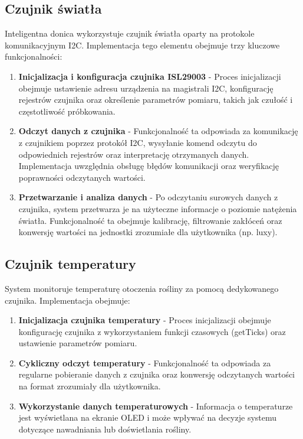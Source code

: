 \documentclass{article}
\begin{document}
\subsection{Czujnik światła}
\label{sec:czujnik_swiatla}
Inteligentna donica wykorzystuje czujnik światła oparty na protokole komunikacyjnym I2C. Implementacja tego elementu obejmuje trzy kluczowe funkcjonalności:

\begin{enumerate}
    \item \textbf{Inicjalizacja i konfiguracja czujnika ISL29003} - Proces inicjalizacji obejmuje ustawienie adresu urządzenia na magistrali I2C, konfigurację rejestrów czujnika oraz określenie parametrów pomiaru, takich jak czułość i częstotliwość próbkowania.

    \item \textbf{Odczyt danych z czujnika} - Funkcjonalność ta odpowiada za komunikację z czujnikiem poprzez protokół I2C, wysyłanie komend odczytu do odpowiednich rejestrów oraz interpretację otrzymanych danych. Implementacja uwzględnia obsługę błędów komunikacji oraz weryfikację poprawności odczytanych wartości.

    \item \textbf{Przetwarzanie i analiza danych} - Po odczytaniu surowych danych z czujnika, system przetwarza je na użyteczne informacje o poziomie natężenia światła. Funkcjonalność ta obejmuje kalibrację, filtrowanie zakłóceń oraz konwersję wartości na jednostki zrozumiałe dla użytkownika (np. luxy).
\end{enumerate}

\subsection{Czujnik temperatury}
System monitoruje temperaturę otoczenia rośliny za pomocą dedykowanego czujnika. Implementacja obejmuje:

\begin{enumerate}
    \item \textbf{Inicjalizacja czujnika temperatury} - Proces inicjalizacji obejmuje konfigurację czujnika z wykorzystaniem funkcji czasowych (getTicks) oraz ustawienie parametrów pomiaru.
    
    \item \textbf{Cykliczny odczyt temperatury} - Funkcjonalność ta odpowiada za regularne pobieranie danych z czujnika oraz konwersję odczytanych wartości na format zrozumiały dla użytkownika.
    
    \item \textbf{Wykorzystanie danych temperaturowych} - Informacja o temperaturze jest wyświetlana na ekranie OLED i może wpływać na decyzje systemu dotyczące nawadniania lub doświetlania rośliny.
\end{enumerate}
\end{document}
